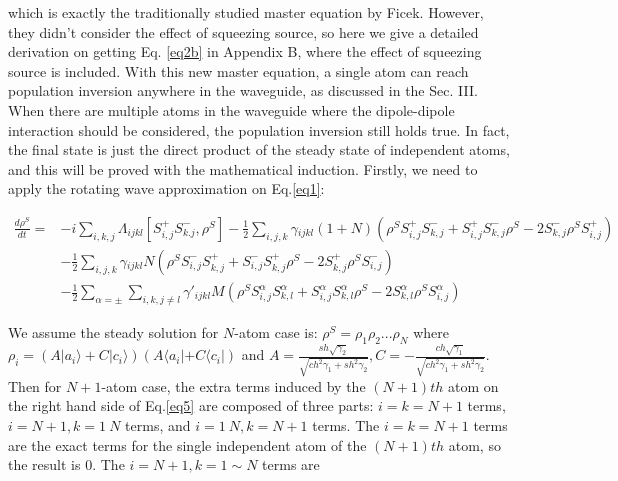 \documentclass[aps,showpacs,twocolumn,twoside,groupedaddress]{revtex4}
\begin{document}
which is exactly the traditionally studied master equation\cite{tanas2004stationary} by Ficek. However, they didn't consider the effect of squeezing source, so here we give a detailed derivation on getting Eq. \eqref{eq2b} in Appendix B, where the effect of squeezing source is included. With this new master equation, a single atom can reach population inversion anywhere in the waveguide, as discussed in the Sec. III. When there are multiple atoms in the waveguide where the dipole-dipole interaction should be considered, the population inversion still holds true. In fact, the final state is just the direct product of the steady state of independent atoms, and this will be proved with the mathematical induction. Firstly, we need to apply the rotating wave approximation on Eq.\eqref{eq1}: 
\begin{widetext}
\begin{equation}
\label{eq5}
\begin{split}
\frac{d\rho^{S}}{dt}=&-i\underset{i,k,j}{\sum}\Lambda_{ijkl}[S_{i,j}^{+}S_{k.j}^{-},\rho^{S}]-\frac{1}{2}\underset{i,j,k}{\sum}\gamma{}_{ijkl}(1+N)(\rho^{S}S_{i,j}^{+}S_{k,j}^{-}+S_{i,j}^{+}S_{k,j}^{-}\rho^{S}-2S_{k,j}^{-}\rho^{S}S_{i,j}^{+}) \\
& -\frac{1}{2}\underset{i,j,k}{\sum}\gamma{}_{ijkl}N(\rho^{S}S_{i,j}^{-}S_{k,j}^{+}+S_{i,j}^{-}S_{k,j}^{+}\rho^{S}-2S_{k,j}^{+}\rho^{S}S_{i,j}^{-})\\
& -\frac{1}{2}\sum_{\alpha=\pm}\underset{i,k,j\ne l}{\sum}\gamma'_{ijkl}M(\rho^{S}S_{i,j}^{\alpha}S_{k,l}^{\alpha}+S_{i,j}^{\alpha}S_{k,l}^{\alpha}\rho^{S}-2S_{k,l}^{\alpha}\rho^{S}S_{i,j}^{\alpha})
\end{split}
\end{equation}
\end{widetext}
We assume the steady solution for $N$-atom case is: $\rho^{S}=\rho_{1}\rho_{2}...\rho_{N}$ where $\rho_{i}=(A|a_{i}\rangle+C|c_{i}\rangle)(A\langle a_{i}|+C\langle c_{i}|)$ and $A=\frac{sh\sqrt{\gamma_{2}}}{\sqrt{ch^{2}\gamma_{1}+sh^{2}\gamma_{2}}}, C=-\frac{ch\sqrt{\gamma_{1}}}{\sqrt{ch^{2}\gamma_{1}+sh^{2}\gamma_{2}}}$. Then for $N+1$-atom case, the extra terms induced by the $(N+1)th$ atom on the right hand side of Eq.\eqref{eq5} are composed of three parts: $i=k=N+1$ terms, $i=N+1, k=1~N$ terms, and $i=1~N, k=N+1$ terms. The $i=k=N+1$ terms are the exact terms for the single independent atom of the $(N+1)th$ atom, so the result is 0. The $i=N+1, k=1\sim N$ terms are 
\end{document}
